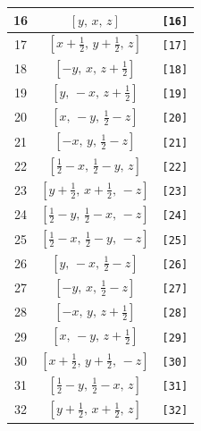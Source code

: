 \documentclass[fleqn,8pt]{jsarticle}
\begin{document}
\begin{longtable}{ccc}
16 & $\left[ y,\, x,\, z \right]$ & {\tt [16]} \\ \hline
17 & $\left[ x + \frac{1}{2},\, y + \frac{1}{2},\, z \right]$ & {\tt [17]} \\ \hline
18 & $\left[ - y,\, x,\, z + \frac{1}{2} \right]$ & {\tt [18]} \\ \hline
19 & $\left[ y,\, - x,\, z + \frac{1}{2} \right]$ & {\tt [19]} \\ \hline
20 & $\left[ x,\, - y,\, \frac{1}{2} - z \right]$ & {\tt [20]} \\ \hline
21 & $\left[ - x,\, y,\, \frac{1}{2} - z \right]$ & {\tt [21]} \\ \hline
22 & $\left[ \frac{1}{2} - x,\, \frac{1}{2} - y,\, z \right]$ & {\tt [22]} \\ \hline
23 & $\left[ y + \frac{1}{2},\, x + \frac{1}{2},\, - z \right]$ & {\tt [23]} \\ \hline
24 & $\left[ \frac{1}{2} - y,\, \frac{1}{2} - x,\, - z \right]$ & {\tt [24]} \\ \hline
25 & $\left[ \frac{1}{2} - x,\, \frac{1}{2} - y,\, - z \right]$ & {\tt [25]} \\ \hline
26 & $\left[ y,\, - x,\, \frac{1}{2} - z \right]$ & {\tt [26]} \\ \hline
27 & $\left[ - y,\, x,\, \frac{1}{2} - z \right]$ & {\tt [27]} \\ \hline
28 & $\left[ - x,\, y,\, z + \frac{1}{2} \right]$ & {\tt [28]} \\ \hline
29 & $\left[ x,\, - y,\, z + \frac{1}{2} \right]$ & {\tt [29]} \\ \hline
30 & $\left[ x + \frac{1}{2},\, y + \frac{1}{2},\, - z \right]$ & {\tt [30]} \\ \hline
31 & $\left[ \frac{1}{2} - y,\, \frac{1}{2} - x,\, z \right]$ & {\tt [31]} \\ \hline
32 & $\left[ y + \frac{1}{2},\, x + \frac{1}{2},\, z \right]$ & {\tt [32]} \\
\end{longtable}
\end{document}
